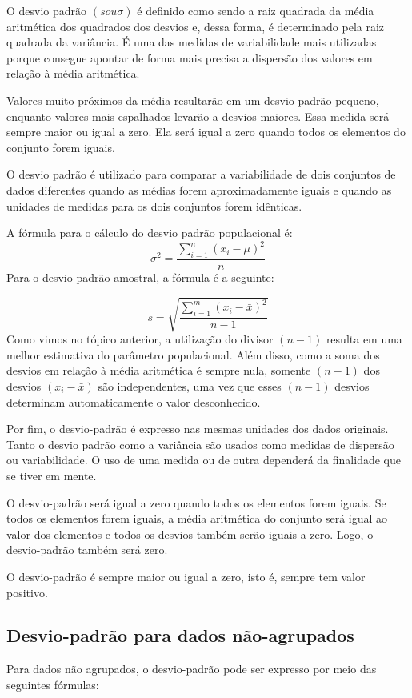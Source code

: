 O desvio padrão \((s ou \sigma)\) é definido como sendo a raiz quadrada da média aritmética dos quadrados dos
desvios e, dessa forma, é determinado pela raiz quadrada da variância. É uma das medidas de variabilidade
mais utilizadas porque consegue apontar de forma mais precisa a dispersão dos valores em relação à
média aritmética.

Valores muito próximos da média resultarão em um desvio-padrão pequeno, enquanto valores mais espalhados levarão a desvios maiores. Essa medida será sempre maior ou igual a zero. Ela será igual a zero quando todos os elementos do conjunto forem iguais.

O desvio padrão é utilizado para comparar a variabilidade de dois conjuntos de dados diferentes quando as médias forem aproximadamente iguais e quando as unidades de medidas para os dois conjuntos forem idênticas.

A fórmula para o cálculo do desvio padrão populacional é:
\[
\sigma^2 =
\frac{\sum_{i=1}^{n}(x_i-\mu)^2}{n}
\]
Para o desvio padrão amostral, a fórmula é a seguinte:

\[
s = \sqrt{\frac{\sum_{i=1}^{m}(x_i-\bar{x})^2}{n-1}}
\]
Como vimos no tópico anterior, a utilização do divisor $(n-1)$ resulta em uma melhor estimativa do
parâmetro populacional. Além disso, como a soma dos desvios em relação à média aritmética é sempre nula, somente $(n-1)$ dos desvios $(x_i-\bar{x})$ são independentes, uma vez que esses $(n-1)$ desvios determinam automaticamente o valor desconhecido.

Por fim, o desvio-padrão é expresso nas mesmas unidades dos dados originais. Tanto o desvio padrão como a variância são usados como medidas de dispersão ou variabilidade. O uso de uma medida ou de outra dependerá da finalidade que se tiver em mente.

O desvio-padrão será igual a zero quando todos os elementos forem iguais. Se todos os elementos forem iguais, a média aritmética do conjunto será igual ao valor dos elementos e todos os desvios
também serão iguais a zero. Logo, o desvio-padrão também será zero.

O desvio-padrão é sempre maior ou igual a zero, isto é, sempre tem valor positivo.

\subsection{Desvio-padrão para dados não-agrupados}

Para dados não agrupados, o desvio-padrão pode ser expresso por meio das seguintes fórmulas:

